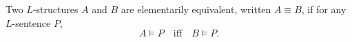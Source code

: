 Two $L$-structures $A$ and $B$ are elementarily equivalent, written $A \equiv B$, if for any $L$-sentence $P$,
$$A \vDash P \quad \text{iff} \quad B \vDash P.$$
